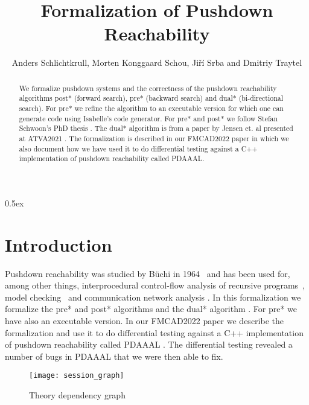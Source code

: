 \documentclass[10pt,a4paper]{article}
\begin{document}
\title{Formalization of Pushdown Reachability}
\author{Anders Schlichtkrull, Morten Konggaard Schou, Ji\v{r}\'i Srba and Dmitriy Traytel}
\date{}

\maketitle

\begin{abstract}
\noindent
We formalize pushdown systems and the correctness of the pushdown reachability algorithms post* (forward search), pre* (backward search) and dual* (bi-directional search).
For pre* we refine the algorithm to an executable version for which one can generate code using Isabelle's code generator.
For pre* and post* we follow Stefan Schwoon's PhD thesis \cite{schwoon2002model}. The dual* algorithm is from a paper by Jensen et. al presented at ATVA2021 \cite{DBLP:conf/atva/JensenSSSVD21}.
The formalization is described in our FMCAD2022 paper \cite{DBLP:conf/fmcad/SchlichtkrullSST22} in which we also document how we have used it to do differential
testing against a C++ implementation of pushdown reachability called PDAAAL.


\end{abstract}

\tableofcontents

\newpage

\parindent 0pt
\parskip 0.5ex

\section{Introduction}
Pushdown reachability was studied by B{\"u}chi in 1964~\cite{buchi1964regular} and has been used for, among other things, 
interprocedural control-flow analysis of recursive programs~\cite{esparza1999automata,conway2005incremental}, 
model checking~\cite{esparza2001bdd,moped,jmoped,bouajjani1997reachability} and communication network analysis \cite{JKMSST:coNEXT:18,jensen2020aalwines,DJJKMSST:TON:21}.
In this formalization we formalize the pre* and post* algorithms \cite{schwoon2002model} and the dual* algorithm \cite{DBLP:conf/atva/JensenSSSVD21}. For pre* we have also an executable version.
In our FMCAD2022 paper \cite{DBLP:conf/fmcad/SchlichtkrullSST22} we describe the formalization and use it to
do differential testing against a C++ implementation of pushdown reachability called PDAAAL \cite{DBLP:conf/atva/JensenSSSVD21}.
The differential testing revealed a number of bugs in PDAAAL that we were then able to fix.

\begin{figure}
\begin{center}
  \texttt{[image: session\_graph]}
\end{center}
\caption{Theory dependency graph}
\label{fig:thys}
\end{figure}

\newpage





\end{document}
